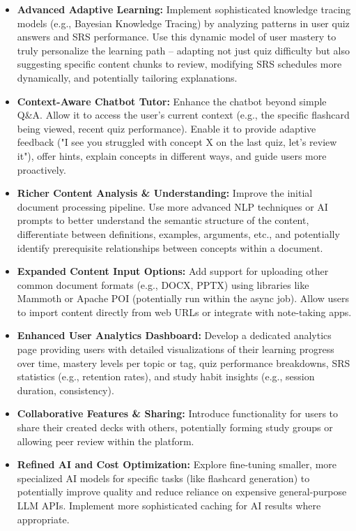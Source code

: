 \documentclass[
	letterpaper,
	11pt
]{jdf}
\begin{document}
\begin{itemize}
    \item \textbf{Advanced Adaptive Learning:} Implement sophisticated knowledge tracing models (e.g., Bayesian Knowledge Tracing) by analyzing patterns in user quiz answers and SRS performance. Use this dynamic model of user mastery to truly personalize the learning path – adapting not just quiz difficulty but also suggesting specific content chunks to review, modifying SRS schedules more dynamically, and potentially tailoring explanations.
    \item \textbf{Context-Aware Chatbot Tutor:} Enhance the chatbot beyond simple Q\&A. Allow it to access the user's current context (e.g., the specific flashcard being viewed, recent quiz performance). Enable it to provide adaptive feedback ("I see you struggled with concept X on the last quiz, let's review it"), offer hints, explain concepts in different ways, and guide users more proactively.
    \item \textbf{Richer Content Analysis \& Understanding:} Improve the initial document processing pipeline. Use more advanced NLP techniques or AI prompts to better understand the semantic structure of the content, differentiate between definitions, examples, arguments, etc., and potentially identify prerequisite relationships between concepts within a document.
    \item \textbf{Expanded Content Input Options:} Add support for uploading other common document formats (e.g., DOCX, PPTX) using libraries like Mammoth or Apache POI (potentially run within the async job). Allow users to import content directly from web URLs or integrate with note-taking apps.
    \item \textbf{Enhanced User Analytics Dashboard:} Develop a dedicated analytics page providing users with detailed visualizations of their learning progress over time, mastery levels per topic or tag, quiz performance breakdowns, SRS statistics (e.g., retention rates), and study habit insights (e.g., session duration, consistency).
    \item \textbf{Collaborative Features \& Sharing:} Introduce functionality for users to share their created decks with others, potentially forming study groups or allowing peer review within the platform.
    \item \textbf{Refined AI and Cost Optimization:} Explore fine-tuning smaller, more specialized AI models for specific tasks (like flashcard generation) to potentially improve quality and reduce reliance on expensive general-purpose LLM APIs. Implement more sophisticated caching for AI results where appropriate.
\end{itemize}
\end{document}
